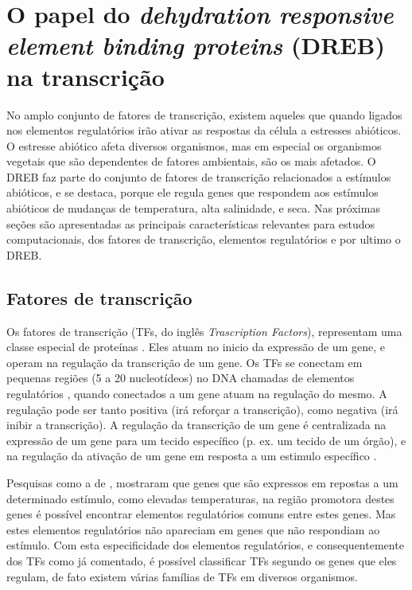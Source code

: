 \chapter{O papel do \textit{dehydration responsive element binding proteins} (DREB) na transcrição}

No amplo conjunto de fatores de transcrição, existem aqueles que quando ligados nos elementos regulatórios irão ativar as respostas da célula a estresses abióticos. O estresse abiótico afeta diversos organismos, mas em especial os organismos vegetais que são dependentes de fatores ambientais, são os mais afetados. O DREB faz parte do conjunto de fatores de transcrição relacionados a estímulos abióticos, e se destaca, porque ele regula genes que respondem aos estímulos abióticos de mudanças de temperatura, alta salinidade, e seca. Nas próximas seções são apresentadas as principais características relevantes para estudos computacionais, dos fatores de transcrição, elementos regulatórios e por ultimo o DREB.


\section{Fatores de transcrição}

Os fatores de transcrição (TFs, do inglês \textit{Trascription Factors}), representam uma classe especial de proteínas \cite{Werner2009}. Eles atuam no inicio da expressão de um gene, e operam na regulação da transcrição de um gene. Os TFs se conectam em pequenas regiões (5 a 20 nucleotídeos) no DNA chamadas de elementos regulatórios , quando conectados a um gene atuam na regulação do mesmo. A regulação pode ser tanto positiva (irá reforçar a transcrição), como negativa (irá inibir a transcrição). A regulação da transcrição de um gene é centralizada na expressão de um gene para um tecido específico (p. ex. um tecido de um órgão), e na regulação da ativação de um gene em resposta a um estimulo específico \cite{Latchman1997}.

Pesquisas como a de \cite{Davidson1983}, mostraram que genes que são expressos em repostas a um determinado estímulo, como elevadas temperaturas, na região promotora destes genes é possível encontrar elementos regulatórios comuns entre estes genes. Mas estes elementos regulatórios não apareciam em genes que não respondiam ao estímulo. Com esta especificidade dos elementos regulatórios, e consequentemente dos TFs como já comentado, é possível classificar TFs segundo os genes que eles regulam, de fato existem várias famílias de TFs em diversos organismos.

